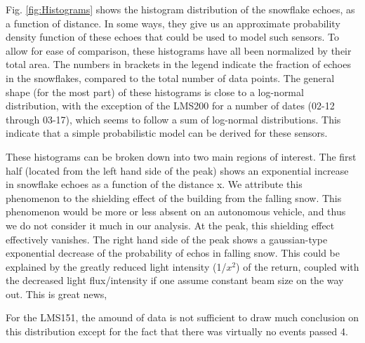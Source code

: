 Fig. \ref{fig:Histograms} shows the histogram distribution of the snowflake echoes, as a function of distance. In some ways, they give us an approximate probability density function of these echoes that could be used to model such sensors. To allow for ease of comparison, these histograms have all been normalized by their total area. The numbers in brackets in the legend indicate the fraction of echoes in the snowflakes, compared to the total number of data points. The general shape (for the most part) of these histograms is close to a log-normal distribution, with the exception of the LMS200 for a number of dates (02-12 through 03-17), which seems to follow a sum of log-normal distributions. This indicate that a simple probabilistic model can be derived for these sensors.

These histograms can be broken down into two main regions of interest. The first half (located from the left hand side of the peak) shows an exponential increase in snowflake echoes as a function of the distance x. We attribute this phenomenon to the shielding effect of the building from the falling snow. This phenomenon would be more or less absent on an autonomous vehicle, and thus we do not consider it much in our analysis. At the peak, this shielding effect effectively vanishes. The right hand side of the peak shows a gaussian-type exponential decrease of the probability of echos in falling snow. This could be explained by the greatly reduced light intensity (1/$x^2$) of the return, coupled with the decreased light flux/intensity if one assume constant beam size on the way out. This is great news, 

For the LMS151, the amound of data is not sufficient to draw much conclusion on this distribution except for the fact that there was virtually no events passed 4.


